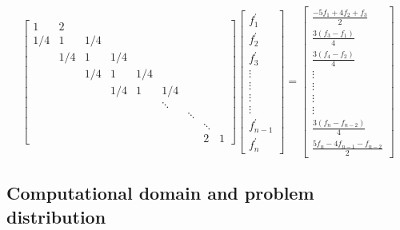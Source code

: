 \documentclass{elsarticle}
\begin{document}
\begin{equation} \label{eqn:compact-tridiagonal-system}
 \begin{bmatrix}
     1&2\\
     1/4&1&1/4\\
     &1/4&1&1/4\\
     &&1/4&1&1/4\\
     &&&1/4&1&1/4\\
     &&&&&\ddots\\
     &&&&&&\ddots\\
     &&&&&&&\ddots\\
     &&&&&&&2&1
  \end{bmatrix}
  \begin{bmatrix}
      f^{\prime}_1 \\
      f^{\prime}_2 \\
      f^{\prime}_3 \\
      \vdots \\
      \vdots \\
      \vdots \\
      \vdots \\
      f^{\prime}_{n-1} \\
      f^{\prime}_n
   \end{bmatrix}
 =
 \begin{bmatrix}
     \frac{-5f_1 + 4f_2 + f_3}{2}\\
     \frac{3(f_{3} - f_{1})}{4}\\
     \frac{3(f_{4} - f_{2})}{4}\\
     \vdots\\
     \vdots\\
     \vdots\\
     \vdots\\
     \frac{3(f_{n} - f_{n-2})}{4}\\
     \frac{5f_{n} - 4f_{n-1} - f_{n-2}}{2}
  \end{bmatrix}
\end{equation}

\subsection{Computational domain and problem distribution}
\end{document}
